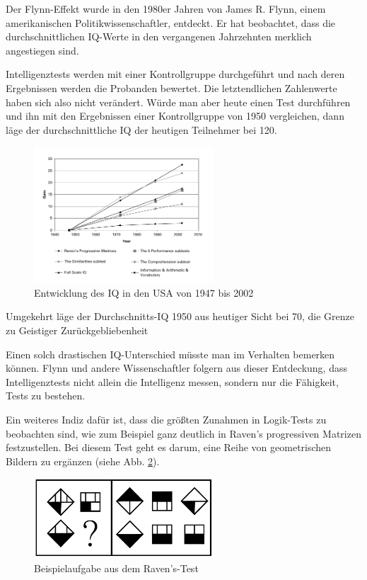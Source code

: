 Der Flynn-Effekt wurde in den 1980er Jahren von James R. Flynn, einem amerikanischen Politikwissenschaftler, entdeckt. Er hat beobachtet, dass die durchschnittlichen IQ-Werte in den vergangenen Jahrzehnten merklich angestiegen sind.

Intelligenztests werden mit einer Kontrollgruppe durchgeführt und nach deren Ergebnissen werden die Probanden bewertet. Die letztendlichen Zahlenwerte haben sich also nicht verändert. Würde man aber heute einen Test durchführen und ihn mit den Ergebnissen einer Kontrollgruppe von 1950 vergleichen, dann läge der durchschnittliche IQ der heutigen Teilnehmer bei 120.

\begin{figure}[H]
  \centering
  \includegraphics[width=0.6\textwidth]{img/Flynn.png}
  \caption{Entwicklung des IQ in den USA von 1947 bis 2002 \cite{flynn}}
  \label{fig:flynn}
\end{figure}

Umgekehrt läge der Durchschnitts-IQ 1950 aus heutiger Sicht bei 70, die Grenze zu \glqq Geistiger Zurückgebliebenheit\grqq{}
\cite{ted_flynn}

Einen solch drastischen IQ-Unterschied müsste man im Verhalten bemerken können. Flynn und andere Wissenschaftler folgern aus dieser Entdeckung, dass Intelligenztests nicht allein die Intelligenz messen, sondern nur die Fähigkeit, Tests zu bestehen.

Ein weiteres Indiz dafür ist, dass die größten Zunahmen in Logik-Tests zu beobachten sind, wie zum Beispiel ganz deutlich in \glqq Raven's progressiven Matrizen \grqq{} festzustellen. Bei diesem Test geht es darum, eine Reihe von geometrischen Bildern zu ergänzen (siehe Abb. \ref{fig:ravens}).

\begin{figure}[H]
  \centering
  \includegraphics[width=0.6\textwidth]{img/ravens.png}
  \caption{Beispielaufgabe aus dem Raven's-Test \cite{flynn}}
  \label{fig:ravens}
\end{figure}

